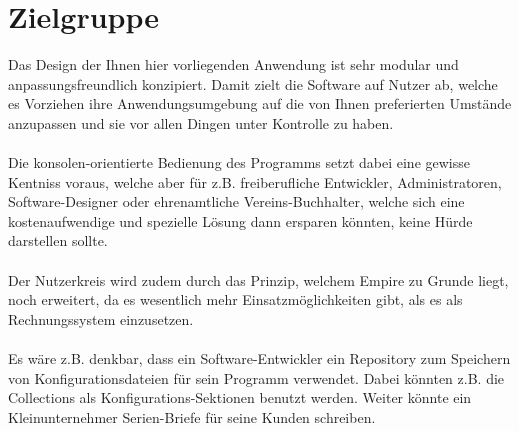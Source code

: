 
\section{Zielgruppe}

Das Design der Ihnen hier vorliegenden Anwendung ist sehr modular und anpassungsfreundlich konzipiert. Damit zielt die Software auf Nutzer ab, welche
es Vorziehen ihre Anwendungsumgebung auf die von Ihnen preferierten Umstände anzupassen und sie vor allen Dingen unter Kontrolle zu haben.
\\\\
Die konsolen-orientierte Bedienung des Programms setzt dabei eine gewisse Kentniss voraus, welche aber für z.B. freiberufliche Entwickler, Administratoren,
Software-Designer oder ehrenamtliche Vereins-Buchhalter, welche sich eine kostenaufwendige und spezielle Lösung dann ersparen könnten, keine Hürde darstellen sollte.
\\\\
Der Nutzerkreis wird zudem durch das Prinzip, welchem Empire zu Grunde liegt, noch erweitert, da es wesentlich mehr Einsatzmöglichkeiten gibt, als es als Rechnungssystem
einzusetzen.
\\\\
Es wäre z.B. denkbar, dass ein Software-Entwickler ein Repository zum Speichern von Konfigurationsdateien für sein Programm verwendet.
Dabei könnten z.B. die Collections als Konfigurations-Sektionen benutzt werden. Weiter könnte ein Kleinunternehmer Serien-Briefe für seine Kunden schreiben.

%
%
